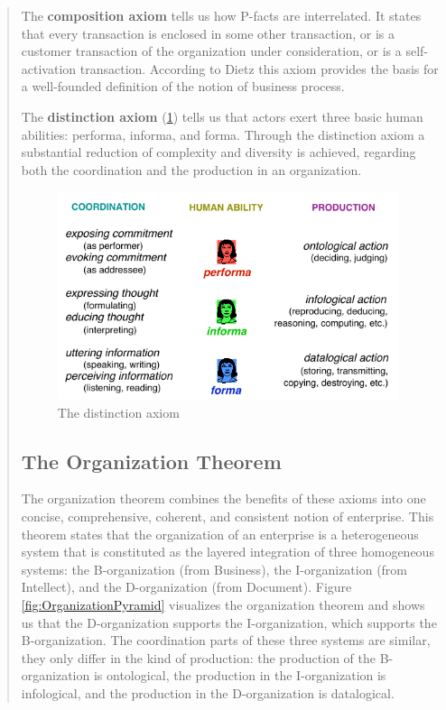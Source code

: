 \begin{quotation}
The \textbf{composition axiom} tells us how P-facts are interrelated. It states that every transaction is enclosed in some other transaction, or is a customer transaction of the organization under consideration, or is a self-activation transaction. According to Dietz this axiom provides the basis for a well-founded definition of the notion of business process.

The \textbf{distinction axiom} (\cref{fig:DisctinctionAxiom}) tells us that actors exert three basic human abilities: performa, informa, and forma. Through the distinction axiom a substantial reduction of complexity and diversity is achieved, regarding both the coordination and the production in an organization.

\begin{figure}[ht!]
	\centering
    \includegraphics[width=10cm, keepaspectratio]{img/DistinctionAxiom}
    \caption{The distinction axiom}
    \label{fig:DisctinctionAxiom}
\end{figure}

\subsection{The Organization Theorem}

The organization theorem combines the benefits of these axioms into one concise, comprehensive, coherent, and consistent notion of enterprise. This theorem states that the organization of an enterprise is a heterogeneous system that is constituted as the layered integration of three homogeneous systems: the B-organization (from Business), the I-organization (from Intellect), and the D-organization (from Document). Figure~ \ref{fig:OrganizationPyramid} visualizes the organization theorem and shows us that the D-organization supports the I-organization, which supports the B-organization. The coordination parts of these three systems are similar, they only differ in the kind of production: the production of the B-organization is ontological, the production in the I-organization is infological, and the production in the D-organization is datalogical.


\end{quotation}
